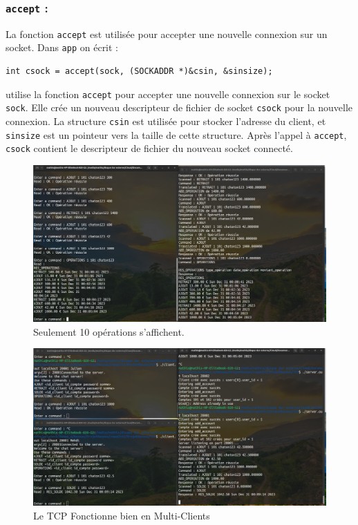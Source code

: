 \documentclass{article}
\begin{document}
\subsubsection*{\texttt{accept} : }
La fonction \texttt{accept} est utilisée pour accepter une nouvelle connexion sur un socket. Dans \texttt{app} on écrit : 
\begin{verbatim}
int csock = accept(sock, (SOCKADDR *)&csin, &sinsize);
\end{verbatim}
utilise la fonction \texttt{accept} pour accepter une nouvelle connexion sur le socket \texttt{sock}. Elle crée un nouveau descripteur de fichier de socket \texttt{csock} pour la nouvelle connexion. La structure \texttt{csin} est utilisée pour stocker l'adresse du client, et \texttt{sinsize} est un pointeur vers la taille de cette structure. Après l'appel à \texttt{accept}, \texttt{csock} contient le descripteur de fichier du nouveau socket connecté.


\begin{figure}[h]
    \hspace*{-2cm}  
    \includegraphics[width=1.25\linewidth]{OPERATIONS_TCP.png}
    \caption{\label{fig:OPERATIONS_TCP}Seulement 10 opérations s'affichent.}
\end{figure}

\begin{figure}[h]
    \hspace*{-2cm}  
    \includegraphics[width=1.25\linewidth]{TCPmultiClients.png}
    \caption{\label{fig:TCPmultiClients}Le TCP Fonctionne bien en Multi-Clients}
\end{figure}
\end{document}
